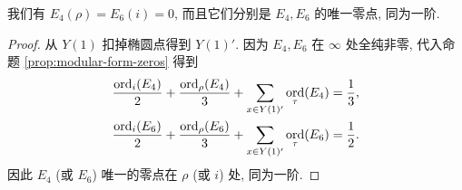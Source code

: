 \begin{proposition}\label{prop:zeros-E4-E6}
	我们有 $E_4(\rho) = E_6(i) = 0$, 而且它们分别是 $E_4, E_6$ 的唯一零点, 同为一阶.
\end{proposition}
\begin{proof}
	从 $Y(1)$ 扣掉椭圆点得到 $Y(1)'$. 因为 $E_4, E_6$ 在 $\infty$ 处全纯非零, 代入命题 \ref{prop:modular-form-zeros} 得到
	\begin{align*}
		\frac{\operatorname*{ord}_i(E_4)}{2} + \frac{\operatorname*{ord}_\rho(E_4)}{3} + \sum_{x \in Y(1)'} \operatorname*{ord}_\tau(E_4) & =  \frac{1}{3}, \\
		\frac{\operatorname*{ord}_i(E_6)}{2} + \frac{\operatorname*{ord}_\rho(E_6)}{3} + \sum_{x \in Y(1)'} \operatorname*{ord}_\tau(E_6) & =  \frac{1}{2}.
	\end{align*}
	因此 $E_4$ (或 $E_6$) 唯一的零点在 $\rho$ (或 $i$) 处, 同为一阶.
\end{proof}


